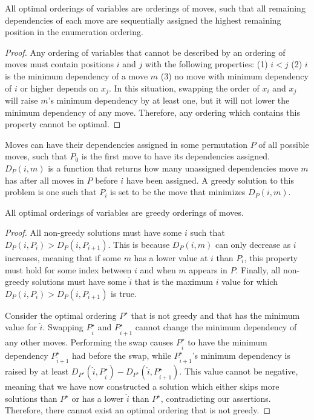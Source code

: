 \documentclass[runningheads,a4paper]{llncs}
\begin{document}
\begin{lemma}
All optimal orderings of variables are orderings of moves, such that
all remaining dependencies of each move are sequentially assigned the
highest remaining position in the enumeration ordering.
\end{lemma}

\begin{proof}
Any ordering of variables that cannot be described by an ordering of moves
must contain positions $i$ and $j$ with the following properties: (1) $i<j$
(2) $i$ is the minimum dependency of a move $m$ (3) no move with minimum dependency
of $i$ or higher depends on $x_j$.
In this situation, swapping the order of $x_i$ and $x_j$ will raise $m$'s
minimum dependency by at least one, but it will not lower the minimum dependency of any
move. Therefore, any ordering which contains this property cannot be optimal.
\end{proof}

Moves can have their dependencies assigned in some permutation $P$ of all possible moves,
such that $P_0$ is the first move to have its dependencies assigned.
$D_P(i, m)$ is a function that returns how many unassigned dependencies move $m$ has after all
moves in $P$ before $i$ have been assigned. A greedy solution to this problem is one such
that $P_i$ is set to be the move that minimizes $D_P(i, m)$.

\begin{theorem}
All optimal orderings of variables are greedy orderings of moves.
\end{theorem}

\begin{proof}
All non-greedy solutions must have some $i$ such that $D_P(i, P_i) > D_P(i, P_{i+1})$.
This is because $D_P(i, m)$ can only decrease as $i$ increases, meaning that if some $m$
has a lower value at $i$ than $P_i$, this property must hold for
some index between $i$ and when $m$ appears in $P$.
Finally, all non-greedy solutions must have some $\hat{i}$
that is the maximum $i$ value for which $D_P(i, P_i) > D_P(i, P_{i+1})$ is true.

Consider the optimal ordering $P^\star$ that is not greedy and that has the minimum value for $\hat{i}$.
Swapping $P_{\hat{i}}^\star$ and $P_{\hat{i}+1}^\star$ cannot change the minimum dependency of any other moves.
Performing the swap causes $P_{\hat{i}}^\star$ to have the minimum dependency $P_{\hat{i}+1}^\star$ had before
the swap, while $P_{\hat{i}+1}^\star$'s minimum dependency is raised by at least
$D_{P^\star}(\hat{i}, P_{\hat{i}}^\star) - D_{P^\star}(\hat{i}, P_{\hat{i}+1}^\star)$. This value
cannot be negative, meaning that we have now constructed a solution which either skips more
solutions than $P^\star$ or has a lower $\hat{i}$ than $P^\star$, contradicting our assertions.
Therefore, there cannot exist an optimal ordering that is not greedy.
\end{proof}
\end{document}
